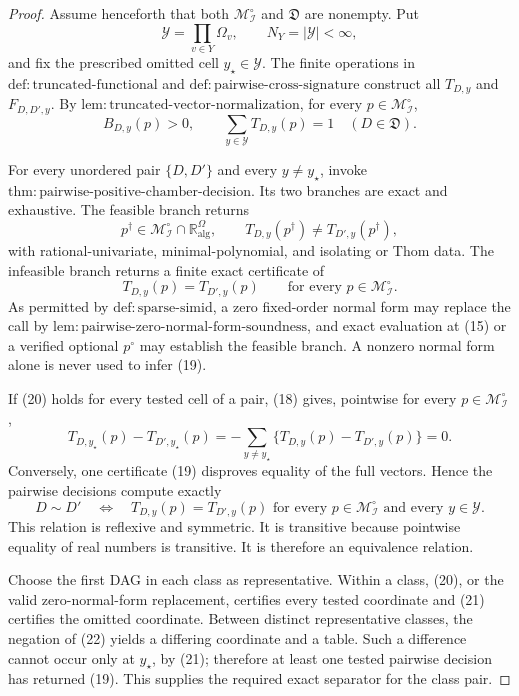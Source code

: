 \documentclass{article}
\begin{document}
\begin{proof}
Assume henceforth that both \(\mathcal M_{\mathcal I}^{\circ}\) and \(\mathfrak D\) are nonempty.  Put
\[
 \mathcal Y=\prod_{v\in Y}\Omega_v,
 \qquad N_Y=|\mathcal Y|<\infty,
\]
and fix the prescribed omitted cell \(y_\star\in\mathcal Y\).  The finite operations in \(\mathrm{def{:}truncated\text{-}functional}\) and \(\mathrm{def{:}pairwise\text{-}cross\text{-}signature}\) construct all \(T_{D,y}\) and \(F_{D,D',y}\).  By \(\mathrm{lem{:}truncated\text{-}vector\text{-}normalization}\), for every \(p\in\mathcal M_{\mathcal I}^{\circ}\),
\[
 B_{D,y}(p)>0,
 \qquad
 \sum_{y\in\mathcal Y}T_{D,y}(p)=1
 \quad(D\in\mathfrak D). \tag{18}
\]

For every unordered pair \(\{D,D'\}\) and every \(y\neq y_\star\), invoke \(\mathrm{thm{:}pairwise\text{-}positive\text{-}chamber\text{-}decision}\).  Its two branches are exact and exhaustive.  The feasible branch returns
\[
 p^\dagger\in\mathcal M_{\mathcal I}^{\circ}
 \cap\mathbb R_{\mathrm{alg}}^\Omega,
 \qquad
 T_{D,y}(p^\dagger)\neq T_{D',y}(p^\dagger), \tag{19}
\]
with rational-univariate, minimal-polynomial, and isolating or Thom data.  The infeasible branch returns a finite exact certificate of
\[
 T_{D,y}(p)=T_{D',y}(p)
 \qquad\text{for every }p\in\mathcal M_{\mathcal I}^{\circ}. \tag{20}
\]
As permitted by \(\mathrm{def{:}sparse\text{-}simid}\), a zero fixed-order normal form may replace the call by \(\mathrm{lem{:}pairwise\text{-}zero\text{-}normal\text{-}form\text{-}soundness}\), and exact evaluation at (15) or a verified optional \(p^{\circ}\) may establish the feasible branch.  A nonzero normal form alone is never used to infer (19).

If (20) holds for every tested cell of a pair, (18) gives, pointwise for every \(p\in\mathcal M_{\mathcal I}^{\circ}\),
\[
 T_{D,y_\star}(p)-T_{D',y_\star}(p)
 =-\sum_{y\neq y_\star}
 \{T_{D,y}(p)-T_{D',y}(p)\}=0. \tag{21}
\]
Conversely, one certificate (19) disproves equality of the full vectors.  Hence the pairwise decisions compute exactly
\[
 D\sim D'
 \quad\Longleftrightarrow\quad
 T_{D,y}(p)=T_{D',y}(p)
 \text{ for every }p\in\mathcal M_{\mathcal I}^{\circ}
 \text{ and every }y\in\mathcal Y. \tag{22}
\]
This relation is reflexive and symmetric.  It is transitive because pointwise equality of real numbers is transitive.  It is therefore an equivalence relation.

Choose the first DAG in each class as representative.  Within a class, (20), or the valid zero-normal-form replacement, certifies every tested coordinate and (21) certifies the omitted coordinate.  Between distinct representative classes, the negation of (22) yields a differing coordinate and a table.  Such a difference cannot occur only at \(y_\star\), by (21); therefore at least one tested pairwise decision has returned (19).  This supplies the required exact separator for the class pair.


\end{proof}
\end{document}

